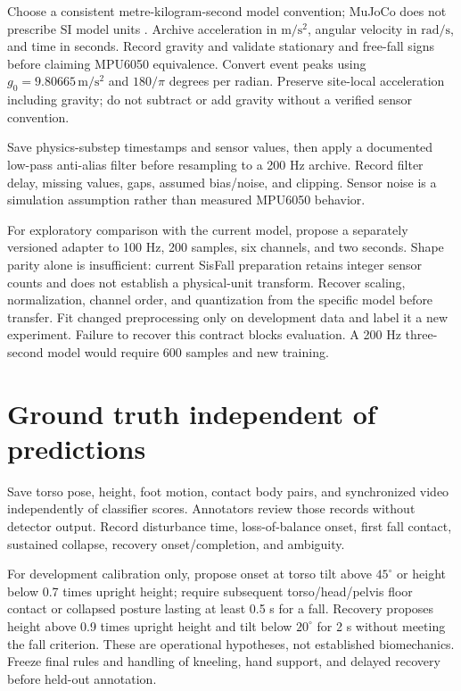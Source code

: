 Choose a consistent metre-kilogram-second model convention; MuJoCo does not prescribe SI model units \cite{mujocoUnits}. Archive acceleration in $\mathrm{m/s^2}$, angular velocity in $\mathrm{rad/s}$, and time in seconds. Record gravity and validate stationary and free-fall signs before claiming MPU6050 equivalence. Convert event peaks using $g_0=9.80665\,\mathrm{m/s^2}$ and $180/\pi$ degrees per radian. Preserve site-local acceleration including gravity; do not subtract or add gravity without a verified sensor convention.

Save physics-substep timestamps and sensor values, then apply a documented low-pass anti-alias filter before resampling to a 200 Hz archive. Record filter delay, missing values, gaps, assumed bias/noise, and clipping. Sensor noise is a simulation assumption rather than measured MPU6050 behavior.

For exploratory comparison with the current model, propose a separately versioned adapter to 100 Hz, 200 samples, six channels, and two seconds. Shape parity alone is insufficient: current SisFall preparation retains integer sensor counts and does not establish a physical-unit transform. Recover scaling, normalization, channel order, and quantization from the specific model before transfer. Fit changed preprocessing only on development data and label it a new experiment. Failure to recover this contract blocks evaluation. A 200 Hz three-second model would require 600 samples and new training.

\section{Ground truth independent of predictions}
Save torso pose, height, foot motion, contact body pairs, and synchronized video independently of classifier scores. Annotators review those records without detector output. Record disturbance time, loss-of-balance onset, first fall contact, sustained collapse, recovery onset/completion, and ambiguity.

For development calibration only, propose onset at torso tilt above $45^\circ$ or height below 0.7 times upright height; require subsequent torso/head/pelvis floor contact or collapsed posture lasting at least 0.5 s for a fall. Recovery proposes height above 0.9 times upright height and tilt below $20^\circ$ for 2 s without meeting the fall criterion. These are operational hypotheses, not established biomechanics. Freeze final rules and handling of kneeling, hand support, and delayed recovery before held-out annotation.

